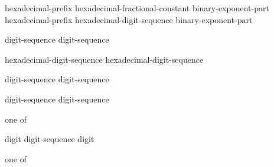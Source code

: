 \begin{bnf}
\br
    hexadecimal-prefix hexadecimal-fractional-constant binary-exponent-part \br
    hexadecimal-prefix hexadecimal-digit-sequence binary-exponent-part 
\end{bnf}

\begin{bnf}
\br
      digit-sequence\br
    digit-sequence 
\end{bnf}

\begin{bnf}
\br
      hexadecimal-digit-sequence\br
    hexadecimal-digit-sequence 
\end{bnf}

\begin{bnf}
\br
      digit-sequence\br
      digit-sequence
\end{bnf}

\begin{bnf}
\br
      digit-sequence\br
      digit-sequence
\end{bnf}

\begin{bnf}
 \textnormal{one of}\br
    \terminal{+  -}
\end{bnf}

\begin{bnf}
\br
    digit\br
    digit-sequence  digit
\end{bnf}

\begin{bnf}
 \textnormal{one of}\br
\end{bnf}

